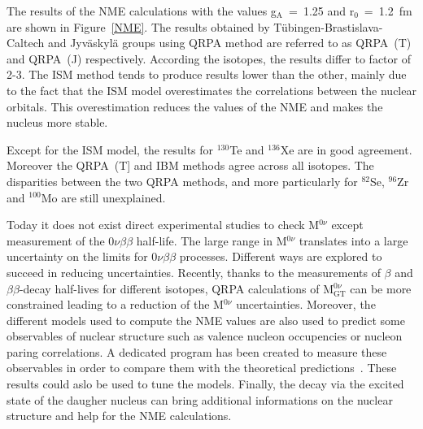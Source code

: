 \documentclass[main.tex]{subfiles}
\begin{document}
\bigskip


\NI The results of the NME calculations with the values g$_{\text{A}}$~=~1.25 and r$_0$~=~1.2~fm are shown in Figure~\ref{NME}. The results obtained by Tübingen-Brastislava-Caltech and Jyväskylä groups using QRPA method are referred to as QRPA~(T) and QRPA~(J) respectively. According the isotopes, the results differ to factor of 2-3. The ISM method tends to produce results lower than the other, mainly due to the fact that the ISM model overestimates the correlations between the nuclear orbitals. This overestimation reduces the values of the NME and makes the nucleus more stable. 


\bigskip


\NI Except for the ISM model, the results for $^{\text{130}}$Te and $^{\text{136}}$Xe are in good agreement. Moreover the QRPA~(T] and IBM methods agree across all isotopes. The disparities between the two QRPA methods, and more particularly for $^{\text{82}}$Se, $^{\text{96}}$Zr and $^{\text{100}}$Mo are still unexplained. 


\bigskip


\NI Today it does not exist direct experimental studies to check M$^{0\nu}$ except measurement of the 0$\nu\beta\beta$ half-life. The large range in M$^{0\nu}$ translates into a large uncertainty on the limits for 0$\nu\beta\beta$ processes. Different ways are explored to succeed in reducing uncertainties. Recently, thanks to the measurements of $\beta$ and $\beta\beta$-decay half-lives for different isotopes, QRPA calculations of M$_{\text{GT}}^{0\nu}$ can be more constrained leading to a reduction of the M$^{0\nu}$ uncertainties. Moreover, the different models used to compute the NME values are also used to predict some observables of nuclear structure such as valence nucleon occupencies or nucleon paring correlations. A dedicated program has been created to measure these observables in order to compare them with the theoretical predictions~\cite{ReduceNMEuncertainties}. These results could aslo be used to tune the models. Finally, the decay via the excited state of the daugher nucleus can bring additional informations on the nuclear structure and help for the NME calculations. 
\end{document}
